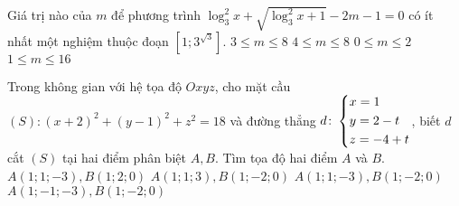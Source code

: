 \begin{ex}%
	Giá trị nào của $m$ để phương trình $\log _3^2 x + \sqrt{\log _3^2 x + 1} - 2m - 1=0$ có ít nhất một nghiệm thuộc đoạn $\left[1; 3^{\sqrt{3}}\right]. $
	\choice
	{$3\le m\le 8$}
	{$4\le m\le 8$}
	{\True $0\le m\le 2$}
	{$1\le m\le 16$}
\end{ex}
\begin{ex}%
	Trong không gian với hệ tọa độ $Oxyz$, cho mặt cầu $(S)\colon (x + 2)^2 + (y - 1)^2 + z^2=18$ và đường thẳng $d\colon \left\{\begin{aligned} & x=1 \\   & y=2 - t \\ 
	& z= - 4 + t\end{aligned}\right. $, biết $d$ cắt $(S)$ tại hai điểm phân biệt $A, B$. Tìm tọa độ hai điểm $A$ và $B$. 
	\choice
	{$A\left( 1; 1; - 3 \right), B\left( 1; 2; 0 \right)$}
	{$A\left( 1; 1; 3 \right), B\left( 1; - 2; 0 \right)$}
	{\True $A\left( 1; 1; - 3 \right), B\left( 1; - 2; 0 \right)$}
	{$A\left( 1; - 1; - 3 \right), B\left( 1; - 2; 0 \right)$}
\end{ex}

